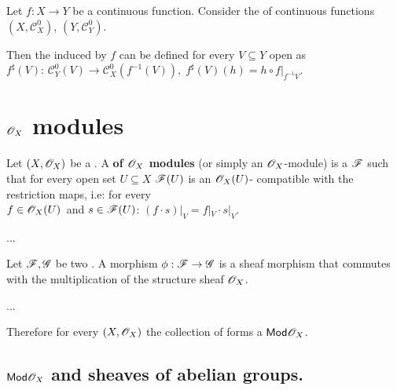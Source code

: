 \documentclass[../main.tex]{subfiles}
\begin{document}
\begin{example}
  Let \(f: X \to Y\) be a continuous function.
  Consider the  of continuous functions \((X, \mathcal{C}_{X}^{0})\), \((Y, \mathcal{C}_{Y}^{0})\).

  Then the  induced by \(f\) can be defined for every \(V \subseteq Y\) open as \(f^{\sharp}(V):\,\mathcal{C}_{Y}^{0}(V) \to \mathcal{C}_{X}^{0}(f^{-1}(V)),\; f^{\sharp}(V)(h) = h \circ f|_{f^{-1}V} \).
\end{example}

\section{\(\mathscr{O}_{X}\) modules}

\begin{definition} \label{def:ox-mod}
  Let  \((X, \mathscr{O}_{X})\) be a .
  A \textbf{ of \(\mathscr{O}_{X}\) modules} (or simply an \(\mathscr{O}_{X}\)-module) is a  \(\mathscr{F}\) such that for every open set \(U \subseteq X\) \(\mathscr{F}(U)\) is an \(\mathscr{O}_{X}(U)\)- compatible with the restriction maps, i.e: for every\\\(f \in \mathscr{O}_{X}(U)\)~and \(s \in \mathscr{F}(U)\): \(\left.\left( f \cdot s \right)\right|_{V} = f|_{V} \cdot s|_{V} \).
\end{definition}

\begin{example}
  ...
\end{example}

\begin{definition} \label{def:ox-mod-morphism}
  Let \(\mathscr{F}, \mathscr{G}\) be two .
  A morphism \(\phi: \mathscr{F} \to \mathscr{G}\) is a sheaf morphism that commutes with the multiplication of the structure sheaf \(\mathscr{O}_{X}\).
\end{definition}

\begin{example}
...
\end{example}

Therefore for every  \((X, \mathscr{O}_{X})\) the collection of  forms a  \(\mathsf{Mod}{\mathscr{O}_{X}}\).

\subsection{\(\mathsf{Mod}{\mathscr{O}_{X}}\) and sheaves of abelian groups.} \label{sec:oxmod-and-sh-ab}
\end{document}
